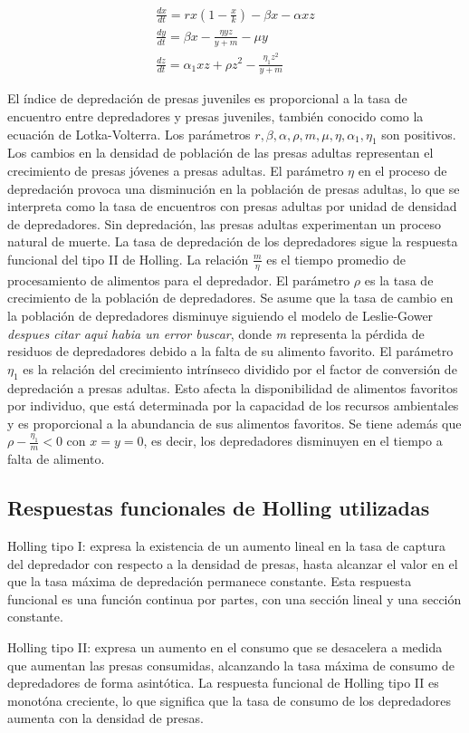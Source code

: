 \documentclass{wscpaperproc}
\theoremstyle{wsc}
\begin{document}
\begin{equation} \label{twoPreyonePredatorEDO}
	\begin{gathered}
		\frac{d x}{d t}=r x\left(1-\frac{x}{k}\right)-\beta x-\alpha x z \\
		\frac{d y}{d t}=\beta x-\frac{\eta y z}{y+m}-\mu y \\
		\frac{d z}{d t}=\alpha_1 x z + \rho z^2-\frac{\eta_1 z^2}{y+m}
	\end{gathered}
\end{equation}
\par
El índice de depredación de presas juveniles es proporcional a la tasa de encuentro entre depredadores y presas juveniles, también conocido como la ecuación de Lotka-Volterra. Los parámetros $r, \beta, \alpha, \rho, m, \mu, \eta , \alpha_1, \eta_1$ son positivos.
Los cambios en la densidad de población de las presas adultas representan el crecimiento de presas j\'ovenes a presas adultas.
El parámetro $\eta$ en el proceso de depredación provoca una disminución en la población de presas adultas, lo que se interpreta
como la tasa de encuentros con presas adultas por unidad de densidad de depredadores. Sin depredación, las presas adultas experimentan un proceso natural
de muerte. La tasa de depredación de los depredadores sigue la respuesta funcional del tipo II de Holling. La relación $\frac{m}{\eta}$ es el tiempo promedio de
procesamiento de alimentos para el depredador. El parámetro $\rho$ es la tasa de crecimiento de la población de depredadores. Se asume que la tasa de cambio
en la población de depredadores disminuye siguiendo el modelo de Leslie-Gower \emph{despues citar aqui habia un error buscar}, donde \emph{m} representa la pérdida de residuos de depredadores debido a la
falta de su alimento favorito. El parámetro $\eta_1$ es la relación del crecimiento intrínseco dividido por el factor de conversión de depredación a presas adultas.
Esto afecta la disponibilidad de alimentos favoritos por individuo, que está determinada por la capacidad de los recursos ambientales y es proporcional a la
abundancia de sus alimentos favoritos. Se tiene además que $\rho - \frac{\eta_1}{m} < 0$ con $x=y=0$, es decir, los depredadores disminuyen en el tiempo a falta de alimento.

\subsection{Respuestas funcionales de Holling utilizadas}
Holling tipo I: expresa la existencia de un aumento lineal en la tasa de captura del depredador con respecto a la densidad de presas, hasta alcanzar el valor en
el que la tasa máxima de depredación permanece constante. Esta respuesta funcional es una función continua por partes, con una sección lineal y una sección constante.\par
Holling tipo II: expresa un aumento en el consumo que se desacelera a medida que aumentan las presas consumidas, alcanzando la tasa máxima de consumo de
depredadores de forma asintótica. La respuesta funcional de Holling tipo II es monotóna creciente, lo que significa que la tasa de consumo
de los depredadores aumenta con la densidad de presas.
\end{document}
